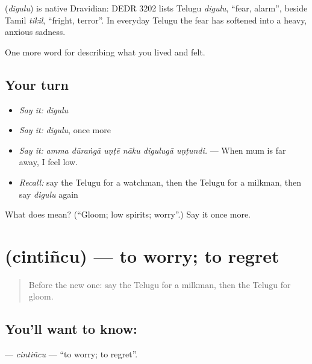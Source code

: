 \begin{cousinweb}
\textbf{} (\emph{digulu}) is native Dravidian: DEDR 3202 lists Telugu \emph{digulu}, \textquotedblleft{}fear, alarm\textquotedblright{}, beside Tamil \emph{tikil}, \textquotedblleft{}fright, terror\textquotedblright{}. In everyday Telugu the fear has softened into a heavy, anxious sadness.
\end{cousinweb}

\begin{grammarlens}[title={What you've built}]
One more word for describing what you lived and felt.
\end{grammarlens}

\subsection*{Your turn}
\begin{itemize}
\raggedright
  \item \emph{Say it:} \emph{digulu}
  \item \emph{Say it:} \emph{digulu}, once more
  \item \emph{Say it:} \emph{amma dūraṅgā uṇṭē nāku digulugā uṇṭundi.} — When mum is far away, I feel low.
  \item \emph{Recall:} say the Telugu for a watchman, then the Telugu for a milkman, then say \emph{digulu} again
\end{itemize}

\begin{tcolorbox}[breakable,colback=teal!4,colframe=teal!35!black,title={Before you move on}]
What does  mean? (\textquotedblleft{}Gloom; low spirits; worry\textquotedblright{}.) Say it once more.
\end{tcolorbox}
\section[\texorpdfstring{\te{చింతించు} (cintiñcu)}{చింతించు (cintiñcu)}]{ (cintiñcu) — to worry; to regret}

\label{lesson:TE-C494-cintincu}



\begin{quote}
Before the new one: say the Telugu for a milkman, then the Telugu for gloom.
\end{quote}

\subsection*{You'll want to know: }
\textbf{} — \emph{cintiñcu} — \textquotedblleft{}to worry; to regret\textquotedblright{}.

